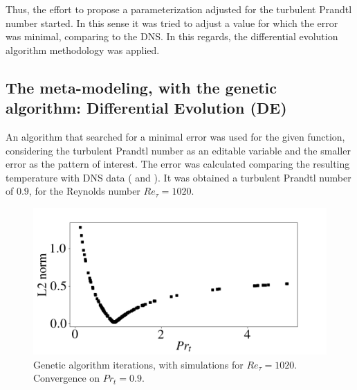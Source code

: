 \documentclass[10pt]{article} %
\begin{document}
Thus, the effort to propose a parameterization adjusted for the turbulent Prandtl number started.
In this sense it was tried to adjust a value for which the error was minimal, comparing to the DNS. In this regards, the differential evolution algorithm methodology was applied. 



\subsection{The meta-modeling, with the genetic algorithm: Differential Evolution (DE)}
An algorithm that searched for a minimal error was used for the given function, considering the turbulent Prandtl number as an editable variable and the smaller error as the pattern of interest.
The error was calculated comparing the resulting temperature with DNS data (\cite{DNS1020} and \cite{DNS150}).
It was obtained a turbulent Prandtl number of $ 0.9$, for the Reynolds number $ Re_\tau = 1020$.
\begin{figure}[!h]
	\centering
	\includegraphics[angle=0, scale=0.35]{fotos_formatacao_final/Genetic_amostra}
	\caption{Genetic algorithm iterations, with simulations for $Re_\tau = 1020$. Convergence on $Pr_t = 0.9 $.}
\end{figure}
\end{document}
